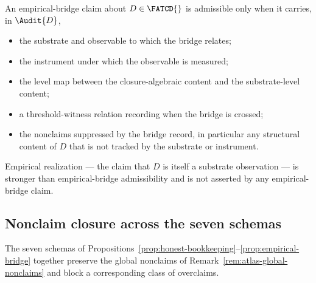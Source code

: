 \begin{proposition}\label{prop:empirical-bridge}
An empirical-bridge claim about \(D \in \FATCD{}\) is admissible only when
it carries, in \(\Audit{D}\),
\begin{itemize}[topsep=2pt,itemsep=1pt]
  \item the substrate and observable to which the bridge relates;
  \item the instrument under which the observable is measured;
  \item the level map between the closure-algebraic content and the
    substrate-level content;
  \item a threshold-witness relation recording when the bridge is
    crossed;
  \item the nonclaims suppressed by the bridge record, in particular any
    structural content of \(D\) that is not tracked by the substrate or
    instrument.
\end{itemize}
Empirical realization --- the claim that \(D\) is itself a substrate
observation --- is stronger than empirical-bridge admissibility and is
not asserted by any empirical-bridge claim.
\end{proposition}


\subsection{Nonclaim closure across the seven schemas}\label{subsec:nonclaim-closure}

The seven schemas of
Propositions~\ref{prop:honest-bookkeeping}--\ref{prop:empirical-bridge}
together preserve the global nonclaims of
Remark~\ref{rem:atlas-global-nonclaims} and block a corresponding
class of overclaims.

